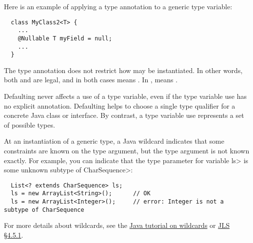 Here is an example of applying a type annotation to a generic type
variable:

\begin{Verbatim}
  class MyClass2<T> {
    ...
    @Nullable T myField = null;
    ...
  }
\end{Verbatim}

\noindent
The type annotation does not restrict how  may be
instantiated.  In other words, both
 and  are
legal, and in both cases  means .
In ,
 means .





Defaulting never affects a use of a type variable, even if the type
variable use has no explicit annotation.  Defaulting helps to choose a
single type qualifier for a concrete Java class or interface.  By contrast,
a type variable use represents a set of possible types.



At an instantiation of a generic type, a Java wildcard indicates that some
constraints are known on the type argument, but the type argument is not known
exactly.
For example, you can indicate that the type parameter for variable \<ls> is
some unknown subtype of \<CharSequence>:

\begin{Verbatim}
  List<? extends CharSequence> ls;
  ls = new ArrayList<String>();      // OK
  ls = new ArrayList<Integer>();     // error: Integer is not a subtype of CharSequence
\end{Verbatim}

For more details about wildcards, see the
\href{https://docs.oracle.com/javase/tutorial/java/generics/wildcards.html}{Java
  tutorial on wildcards} or
\href{https://docs.oracle.com/javase/specs/jls/se17/html/jls-4.html#jls-4.5.1}{JLS
  \S 4.5.1}.

